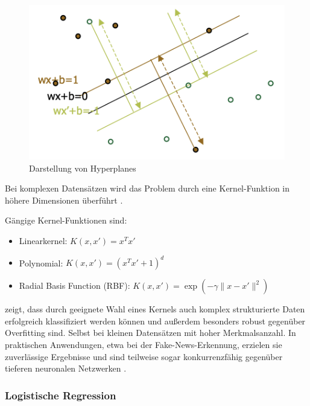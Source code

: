 \begin{figure}[htbp]
    \begin{center}
        \includegraphics[scale=0.5]{static/fig_hyperplanes.png}
        \caption{\label{fig:hyperplanes} Darstellung von Hyperplanes \cite{jakkula2006tutorial}}
    \end{center}
\end{figure}

Bei komplexen Datensätzen wird das Problem durch eine Kernel-Funktion in höhere Dimensionen überführt \cite{jakkula2006tutorial}.

Gängige Kernel-Funktionen sind:
\begin{itemize}
  \item Linearkernel: \( K(x, x') = x^T x' \)
  \item Polynomial: \( K(x, x') = (x^T x' + 1)^d \)
  \item Radial Basis Function (RBF): \( K(x, x') = \exp(-\gamma \|x - x'\|^2) \) \cite{jakkula2006tutorial}
\end{itemize}

\cite{Noble:2006aa} zeigt, dass durch geeignete Wahl eines Kernels auch komplex strukturierte Daten erfolgreich klassifiziert werden können und außerdem 
besonders robust gegenüber Overfitting sind. Selbst bei kleinen Datensätzen mit hoher Merkmalsanzahl. 
In praktischen Anwendungen, etwa bei der Fake-News-Erkennung, erzielen sie zuverlässige Ergebnisse und sind teilweise sogar konkurrenzfähig gegenüber 
tieferen neuronalen Netzwerken \cite{Buddhadev2025, sabir2025}.

\subsubsection{Logistische Regression}

